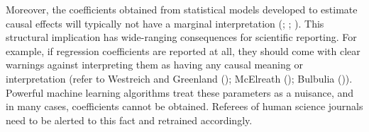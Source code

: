 \documentclass[
  single column]{article}
\begin{document}
Moreover, the coefficients obtained from statistical models developed to
estimate causal effects will typically not have a marginal
interpretation (;
;
). This structural
implication has wide-ranging consequences for scientific reporting. For
example, if regression coefficients are reported at all, they should
come with clear warnings against interpreting them as having any causal
meaning or interpretation (refer to Westreich and Greenland
(); McElreath
(); Bulbulia
()). Powerful machine learning
algorithms treat these parameters as a nuisance, and in many cases,
coefficients cannot be obtained. Referees of human science journals need
to be alerted to this fact and retrained accordingly.
\end{document}
